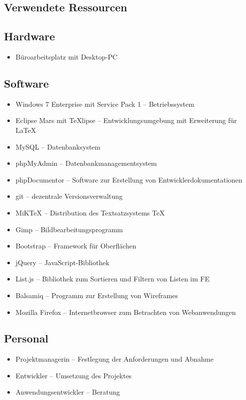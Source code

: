 \subsection{Verwendete Ressourcen}
\label{app:Verwendete Ressourcen}

\subsection*{Hardware}
\begin{itemize}
	\item Büroarbeitsplatz mit Desktop-PC
\end{itemize}

\subsection*{Software}
\begin{itemize}
	\item Windows 7 Enterprise mit Service Pack 1 -- Betriebssystem
	\item Eclipse Mars mit TeXlipse -- Entwicklungsumgebung mit Erweiterung für
	\LaTeX
	\item MySQL -- Datenbanksystem
	\item phpMyAdmin -- Datenbankmanagementsystem
	\item phpDocumentor -- Software zur Erstellung von Entwicklerdokumentationen
	\item git -- dezentrale Versionsverwaltung
	\item MiKTeX -- Distribution des Textsatzsystems \TeX
	\item Gimp -- Bildbearbeitungsprogramm
	\item Bootstrap -- Framework für Oberflächen 
	\item jQuery -- JavaScript-Bibliothek
	\item List.js -- Bibliothek zum Sortieren und Filtern von Listen im \acs{FE}
	\item Balsamiq -- Programm zur Erstellung von Wireframes
	\item Mozilla Firefox -- Internetbrowser zum Betrachten von Webanwendungen
\end{itemize}

\subsection*{Personal}
\begin{itemize}
	\item Projektmanagerin -- Festlegung der Anforderungen und Abnahme  
	\item Entwickler -- Umsetzung des Projektes
	\item Anwendungsentwickler -- Beratung
\end{itemize}